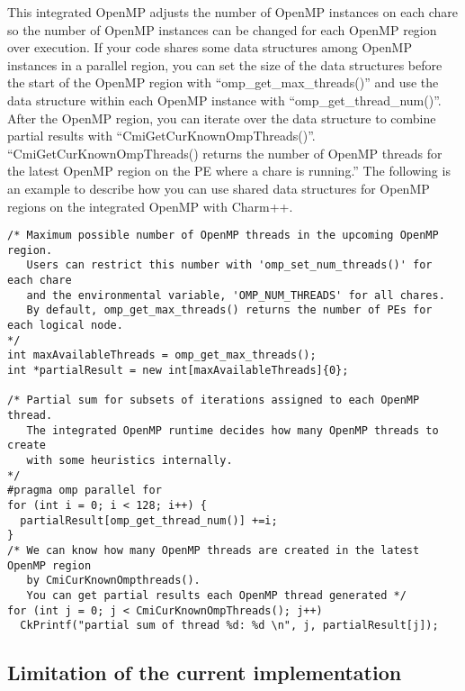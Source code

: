 This integrated OpenMP adjusts the number of OpenMP instances on each chare so the number of 
OpenMP instances can be changed for each OpenMP region over execution.
If your code shares some data structures among OpenMP instances in a parallel region, you can set the size of 
the data structures before the start of the OpenMP region with ``omp\_get\_max\_threads()'' 
and use the data structure within each OpenMP instance with ``omp\_get\_thread\_num()''. 
After the OpenMP region, you can iterate over the data structure to combine partial results 
with ``CmiGetCurKnownOmpThreads()''. ``CmiGetCurKnownOmpThreads() returns the number of OpenMP 
threads for the latest OpenMP region on the PE where a chare is running.'' The following is an
example to describe how you can use shared data structures for OpenMP regions on the integrated 
OpenMP with Charm++.
\begin{verbatim}
/* Maximum possible number of OpenMP threads in the upcoming OpenMP region.
   Users can restrict this number with 'omp_set_num_threads()' for each chare 
   and the environmental variable, 'OMP_NUM_THREADS' for all chares.
   By default, omp_get_max_threads() returns the number of PEs for each logical node.
*/
int maxAvailableThreads = omp_get_max_threads();
int *partialResult = new int[maxAvailableThreads]{0};

/* Partial sum for subsets of iterations assigned to each OpenMP thread.
   The integrated OpenMP runtime decides how many OpenMP threads to create 
   with some heuristics internally.
*/
#pragma omp parallel for
for (int i = 0; i < 128; i++) {
  partialResult[omp_get_thread_num()] +=i;
}
/* We can know how many OpenMP threads are created in the latest OpenMP region
   by CmiCurKnownOmpthreads().
   You can get partial results each OpenMP thread generated */
for (int j = 0; j < CmiCurKnownOmpThreads(); j++)
  CkPrintf("partial sum of thread %d: %d \n", j, partialResult[j]);
\end{verbatim}

\subsection{Limitation of the current implementation}
